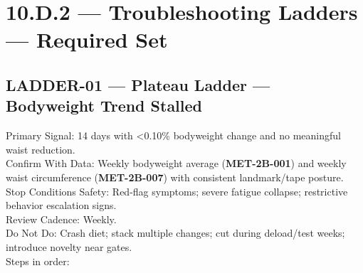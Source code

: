 \documentclass[10pt]{article}
\begin{document}
\endgroup

\newpage

\section*{10.D.2 — Troubleshooting Ladders — Required Set}
{}

\subsection*{LADDER-01 — Plateau Ladder — Bodyweight Trend Stalled}
{}

Primary Signal: 14 days with \textless0.10\% bodyweight change and no meaningful waist reduction.\\
Confirm With Data: Weekly bodyweight average (\textbf{MET-2B-001}) and weekly waist circumference (\textbf{MET-2B-007}) with consistent landmark/tape posture.\\
Stop Conditions Safety: Red-flag symptoms; severe fatigue collapse; restrictive behavior escalation signs.\\
Review Cadence: Weekly.\\
Do Not Do: Crash diet; stack multiple changes; cut during deload/test weeks; introduce novelty near gates.\\
Steps in order:
\end{document}
